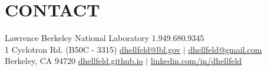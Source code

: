 \vspace{-15pt}
\section{\small{CONTACT}}

Lawrence Berkeley National Laboratory \hfill 1.949.680.9345\\
1 Cyclotron Rd. (B50C - 3315) \hfill \href{mailto:dhellfeld@lbl.gov}{dhellfeld@lbl.gov} $|$ \href{mailto:dhellfeld@gmail.com}{dhellfeld@gmail.com}\\
Berkeley, CA 94720 \hfill \href{https://dhellfeld.github.io}{dhellfeld.github.io} $|$ \href{https://www.linkedin.com/in/dhellfeld/}{linkedin.com/in/dhellfeld}

